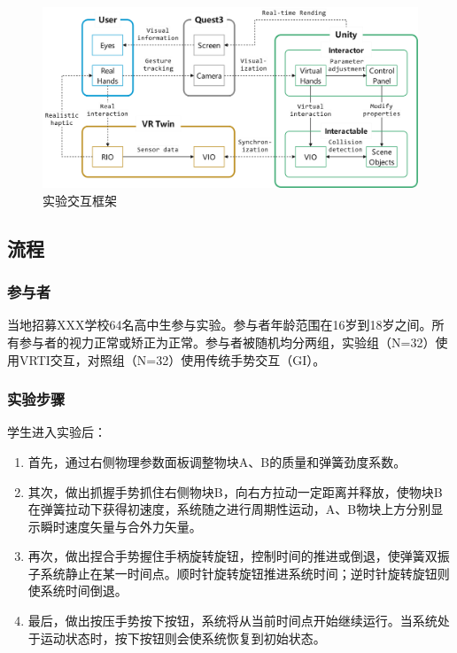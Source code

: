 \documentclass[runningheads]{llncs}
\begin{document}
\begin{figure}[t]
  \centering
  \includegraphics[width=1\textwidth]{image/system-framework-flowchart.pdf}
  \caption{实验交互框架}
  \label{fig:system-framework-flowchart}
\end{figure}

\subsection{流程}
\subsubsection{参与者}
当地招募XXX学校64名高中生参与实验。参与者年龄范围在16岁到18岁之间。所有参与者的视力正常或矫正为正常。参与者被随机均分两组，实验组（N=32）使用VRTI交互，对照组（N=32）使用传统手势交互（GI）。

\subsubsection{实验步骤}
学生进入实验后：

\begin{enumerate}[label=$\bullet$]
  \item 首先，通过右侧物理参数面板调整物块A、B的质量和弹簧劲度系数。
  \item 其次，做出抓握手势抓住右侧物块B，向右方拉动一定距离并释放，使物块B在弹簧拉动下获得初速度，系统随之进行周期性运动，A、B物块上方分别显示瞬时速度矢量与合外力矢量。
  \item 再次，做出捏合手势握住手柄旋转旋钮，控制时间的推进或倒退，使弹簧双振子系统静止在某一时间点。顺时针旋转旋钮推进系统时间；逆时针旋转旋钮则使系统时间倒退。
  \item 最后，做出按压手势按下按钮，系统将从当前时间点开始继续运行。当系统处于运动状态时，按下按钮则会使系统恢复到初始状态。
\end{enumerate}
\end{document}
